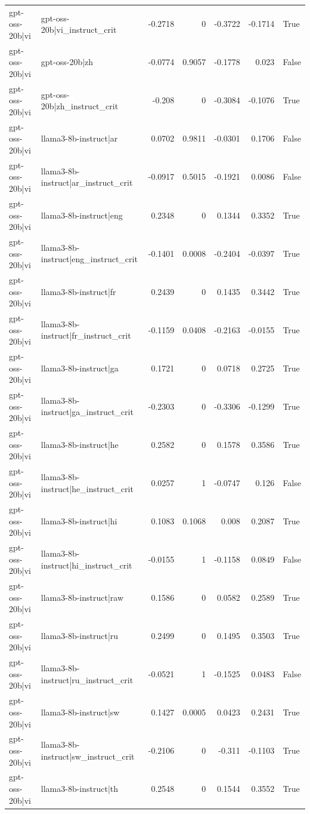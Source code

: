 \begin{table}
\begin{tabular}{l l r r r r l}
gpt-oss-20b|vi & gpt-oss-20b|vi_instruct_crit & -0.2718 & 0 & -0.3722 & -0.1714 & True \\
gpt-oss-20b|vi & gpt-oss-20b|zh & -0.0774 & 0.9057 & -0.1778 & 0.023 & False \\
gpt-oss-20b|vi & gpt-oss-20b|zh_instruct_crit & -0.208 & 0 & -0.3084 & -0.1076 & True \\
gpt-oss-20b|vi & llama3-8b-instruct|ar & 0.0702 & 0.9811 & -0.0301 & 0.1706 & False \\
gpt-oss-20b|vi & llama3-8b-instruct|ar_instruct_crit & -0.0917 & 0.5015 & -0.1921 & 0.0086 & False \\
gpt-oss-20b|vi & llama3-8b-instruct|eng & 0.2348 & 0 & 0.1344 & 0.3352 & True \\
gpt-oss-20b|vi & llama3-8b-instruct|eng_instruct_crit & -0.1401 & 0.0008 & -0.2404 & -0.0397 & True \\
gpt-oss-20b|vi & llama3-8b-instruct|fr & 0.2439 & 0 & 0.1435 & 0.3442 & True \\
gpt-oss-20b|vi & llama3-8b-instruct|fr_instruct_crit & -0.1159 & 0.0408 & -0.2163 & -0.0155 & True \\
gpt-oss-20b|vi & llama3-8b-instruct|ga & 0.1721 & 0 & 0.0718 & 0.2725 & True \\
gpt-oss-20b|vi & llama3-8b-instruct|ga_instruct_crit & -0.2303 & 0 & -0.3306 & -0.1299 & True \\
gpt-oss-20b|vi & llama3-8b-instruct|he & 0.2582 & 0 & 0.1578 & 0.3586 & True \\
gpt-oss-20b|vi & llama3-8b-instruct|he_instruct_crit & 0.0257 & 1 & -0.0747 & 0.126 & False \\
gpt-oss-20b|vi & llama3-8b-instruct|hi & 0.1083 & 0.1068 & 0.008 & 0.2087 & True \\
gpt-oss-20b|vi & llama3-8b-instruct|hi_instruct_crit & -0.0155 & 1 & -0.1158 & 0.0849 & False \\
gpt-oss-20b|vi & llama3-8b-instruct|raw & 0.1586 & 0 & 0.0582 & 0.2589 & True \\
gpt-oss-20b|vi & llama3-8b-instruct|ru & 0.2499 & 0 & 0.1495 & 0.3503 & True \\
gpt-oss-20b|vi & llama3-8b-instruct|ru_instruct_crit & -0.0521 & 1 & -0.1525 & 0.0483 & False \\
gpt-oss-20b|vi & llama3-8b-instruct|sw & 0.1427 & 0.0005 & 0.0423 & 0.2431 & True \\
gpt-oss-20b|vi & llama3-8b-instruct|sw_instruct_crit & -0.2106 & 0 & -0.311 & -0.1103 & True \\
gpt-oss-20b|vi & llama3-8b-instruct|th & 0.2548 & 0 & 0.1544 & 0.3552 & True \\

\end{tabular}
\end{table}
